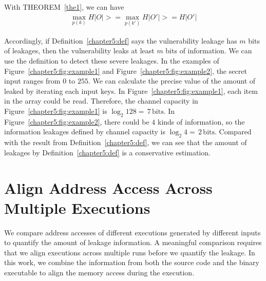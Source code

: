 With THEOREM~\ref{the1}, we can have
\begin{align*}
  \max_{p(k)} H |O| >= \max_{p(k')} H |O'| >= H |O'|
\end{align*}

Accordingly, if Definition~\ref{chapter5:def} says the vulnerability leakage has $m$ bits of leakages, then the vulnerability leaks at least $m$ bits of information. We can use the definition to detect these severe leakages. In the examples of Figure~\ref{chapter5:fig:example1} and Figure~\ref{chapter5:fig:example2}, the secret input ranges from $0$ to $255$. We can calculate the precise value of the amount of leaked by iterating each input keys. In Figure~\ref{chapter5:fig:example1}, each item in the array could be read. Therefore, the channel capacity in Figure~\ref{chapter5:fig:example1} is $\log_2{128} = \,7\, \mathrm{bits}$. In Figure~\ref{chapter5:fig:example2}, there could be $4$ kinds of information, so the information leakages defined by channel capacity is $\log_2{4} = \,2\, \mathrm{bits}$. Compared with the result from Definition~\ref{chapter5:def}, we can see that the amount of leakages by Definition~\ref{chapter5:def} is a conservative estimation.

\section{Align Address Access Across Multiple Executions}
We compare address accesses of different executions generated by different inputs to quantify the amount of leakage information. A meaningful comparison requires that we align executions across multiple runs before we quantify the leakage. In this work, we combine the information from both the source code and the binary executable to align the memory access during the execution.


